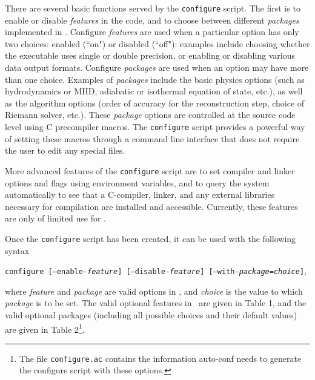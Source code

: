 There are several basic functions served by the {\tt configure} script.
The first is to enable or disable {\it features} in the code, and to
choose between different {\it packages} implemented in \ath.  Configure
{\it features} are used when a particular option has only two choices:
enabled (``on") or disabled (``off"): examples include choosing whether
the executable uses single or double precision, or enabling or disabling
various data output formats.  Configure {\it packages} are used when an
option may have more than one choice.  Examples of {\it packages} include
the basic physics options (such as hydrodynamics or MHD, adiabatic or
isothermal equation of state, etc.), as well as the algorithm options
(order of accuracy for the reconstruction step, choice of Riemann solver,
etc.).  These {\it package} options are controlled at the source code
level using C precompiler macros.  The {\tt configure} script provides
a powerful way of setting these macros through a command line interface
that does not require the user to edit any special files.

More advanced features of the {\tt configure} script are to set compiler
and linker options and flags using environment variables, and to query the
system automatically to see that a C-compiler, linker, and any external
libraries necessary for compilation are installed and accessible.
Currently, these features are only of limited use for \ath.

Once the {\tt configure} script has been created, it can be used
with the following
syntax
\begin{center}
{\tt configure [--enable-{\it feature}] [--disable-{\it feature}]
[--with-{\it package}={\it choice}]},
\end{center}
where {\it feature} and {\it package}
are valid options in \ath, and {\it choice} is the value to which
{\it package} is to be set.  The valid optional features in \ath\ are given in
Table 1, and the valid optional packages (including all possible choices and
their default values) are given in Table 2\footnote{The file {\tt configure.ac}
contains the information auto-conf needs to generate the configure script
with these options.}.

